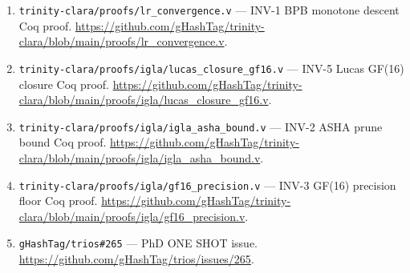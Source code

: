 \begin{enumerate}
\item \texttt{trinity-clara/proofs/lr\_convergence.v} ---
  INV-1 BPB monotone descent Coq proof.
  \url{https://github.com/gHashTag/trinity-clara/blob/main/proofs/lr_convergence.v}.

\item \texttt{trinity-clara/proofs/igla/lucas\_closure\_gf16.v} ---
  INV-5 Lucas GF(16) closure Coq proof.
  \url{https://github.com/gHashTag/trinity-clara/blob/main/proofs/igla/lucas_closure_gf16.v}.

\item \texttt{trinity-clara/proofs/igla/igla\_asha\_bound.v} ---
  INV-2 ASHA prune bound Coq proof.
  \url{https://github.com/gHashTag/trinity-clara/blob/main/proofs/igla/igla_asha_bound.v}.

\item \texttt{trinity-clara/proofs/igla/gf16\_precision.v} ---
  INV-3 GF(16) precision floor Coq proof.
  \url{https://github.com/gHashTag/trinity-clara/blob/main/proofs/igla/gf16_precision.v}.

\item \texttt{gHashTag/trios\#265} --- PhD ONE SHOT issue.
  \url{https://github.com/gHashTag/trios/issues/265}.

\end{enumerate}

